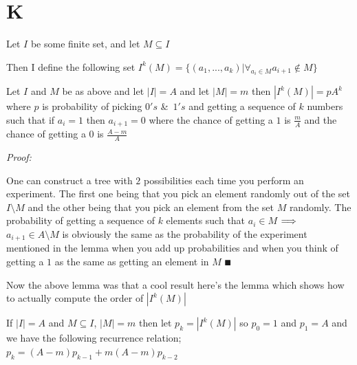 \documentclass[paper=a4,fontsize=paper,12.5pt]{book}
\newcommand{\3}{\vspace*{3mm}}
\newcommand{\Proof}{\textit{Proof:}}
\newcommand{\RIGHT}{\Longrightarrow \hspace*{.5mm}}
\begin{document}
\newpage


\section*{K}

\begin{definition}

Let $I$ be some finite set, and let $M \subseteq I$ 

\3

Then I define the following set ${I}^{k}(M) = \{ (a_{1}, ..., {a}_{k}) | {\forall}_{{a}_{i} \in M}{a}_{i+1} \notin M \}$

\3



\3



\end{definition}

\3

\begin{lemma}

Let $I$ and $M$ be as above and let $|I| = A$ and let $|M| = m$ then $|{I}^{k}(M)| = p{A}^{k}$ where $p$ is probability of picking $0's$ \&\ $1's$ and getting a sequence of $k$ numbers such that if ${a}_{i} = 1$ then ${a}_{i+1} = 0$ where the chance of getting a $1$ is $\frac{m}{A}$ and the chance of getting a $0$ is $\frac{A-m}{A}$

\end{lemma}

\Proof

One can construct a tree with $2$ possibilities each time you perform an experiment. The first one being that you pick an element randomly out of the set $I \setminus M$ and the other being that you pick an element from the set $M$ randomly. The probability of getting a sequence of $k$ elements such that ${a}_{i} \in M$ $\RIGHT$ ${a}_{i+1} \in A \setminus M$ is obviously the same as the probability of the experiment mentioned in the lemma when you add up probabilities and when you think of getting a $1$ as the same as getting an element in $M$ $\QED$

\3

Now the above lemma was that a cool result here's the lemma which shows how to actually compute the order of $|{I}^{k}(M)|$

\3

\begin{lemma}

If $|I| = A$ and $M \subseteq I$, $|M| = m$ then let ${p}_{k} = |{I}^{k}(M)|$ so ${p}_{0} = 1$ and ${p}_{1} = A$ and we have the following recurrence relation; ${p}_{k} = (A-m){p}_{k-1} + m(A-m){p}_{k-2}$



\end{lemma}
\end{document}
